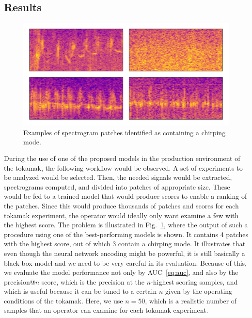 \subsection{Results}
\begin{figure}
\begin{centering}
\includegraphics[scale=0.5]{data/chapter_alfven/anomalies.png}
\par
\end{centering}
\caption{Examples of spectrogram patches identified as containing a chirping
mode.}
\label{fig:alfven_patches}
\end{figure}

During the use of one of the proposed models in the production environment of the tokamak, the following workflow would be observed. A set of experiments to be analyzed would be selected. Then, the needed signals would be extracted, spectrograms computed, and divided into patches of appropriate size. These would be fed to a trained model that would produce scores to enable a ranking of the patches. Since this would produce thousands of patches and scores for each tokamak experiment, the operator would ideally only want examine a few with the highest score. The problem is illustrated in Fig.~\ref{fig:alfven_patches}, where the output of such a procedure using one of the best-performing models is shown. It contains 4 patches with the highest score, out of which 3 contain a chirping mode. It illustrates that even though the neural network encoding might be powerful, it is still basically a black box model and we need to be very careful in its evaluation. Because of this, we evaluate the model performance not only by AUC~\eqref{eq:auc}, and also by the precision@$n$ score, which is the precision at the $n$-highest scoring samples, and which is useful because it can be tuned to a certain $n$ given by the operating conditions of the tokamak. Here, we use $n=50$, which is a realistic number of samples that an operator can examine for each tokamak experiment.

